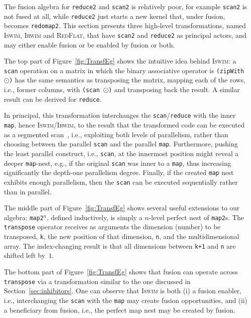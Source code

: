 \documentclass{sigplanconf}  %
\begin{document}
The fusion algebra for {\tt reduce2} and {\tt scan2} is relatively poor,
for example {\tt scan2} is not fused at all, while {\tt reduce2} just
starts a new kernel that, under fusion, becomes {\tt redomap2}.
This section presents three high-level transformations, named
\textsc{Iswim}, \textsc{Irwim} and \textsc{RedFlat}, that have 
{\tt scan2} and {\tt reduce2} as principal actors, and may either
enable fusion or be enabled by fusion or both.

The top part of Figure~\ref{fig:TransfEg} shows the intuitive idea
behind \textsc{Iswim}: a {\tt scan} operation on a matrix in which
the binary associative operator is {\tt (zipWith $\odot$)} has the
same semantics as transposing the matrix, mapping each of the rows,
i.e., former columns, with {\tt (scan $\odot$)} and transposing back
the result. A similar result can be derived for {\tt reduce}.

In principal, this transformation interchanges the {\tt scan}/{\tt reduce}
with the inner {\tt map}, hence \textsc{Iswim}/\textsc{Irwim}, to the result
that the transformed code can be executed as a segmented scan~\cite{segScan},
i.e., exploiting both levels of parallelism, rather than choosing between
the parallel {\tt scan} and the parallel {\tt map}. Furthermore, pushing
the least parallel construct, i.e., {\tt scan}, at the innermost position 
might reveal a deeper {\tt map}-nest, e.g., if the original {\tt scan} was 
inner to a {\tt map}, thus increasing significantly the depth-one 
parallelism degree.   
Finally, if the created {\tt map} nest exhibits enough parallelism, 
then the {\tt scan} can be executed sequentially rather than in parallel. %

The middle part of Figure~\ref{fig:TransfEg} shows several useful 
extensions to our algebra: {\tt map2$^n$}, defined inductively, is
simply a $n$-level perfect nest of {\tt map2}s.   The {\tt transpose} 
operator receives as arguments the dimension (number) to be transposed, {\tt k}, 
the new position of that dimension, {\tt n}, and the multidimensional array.
The index-changing result is that all dimensions between {\tt k+1} and {\tt n}
are shifted left by~$1$.   

The bottom part of Figure~\ref{fig:TransfEg} shows that fusion can operate 
across {\tt transpose} via a transformation similar to the one discussed
in Section~\ref{sec:inhibitors}. One can observe that \textsc{Iswim} is
both (i) a fusion enabler, i.e., interchanging the {\tt scan} with the {\tt map}
may create fusion opportunities, and (ii) a beneficiary from fusion,
i.e., the perfect map nest may be created by fusion. 
\end{document}
